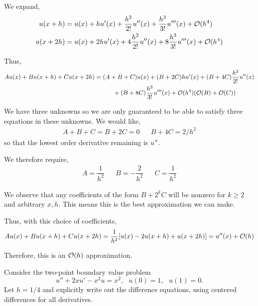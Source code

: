\documentclass[10pt]{article}
\begin{document}
\begin{solution}[Solution]
We expand,
\begin{align*}
    u(x+h) &= u(x) + h u'(x) + \dfrac{h^2}{2!}u''(x) + \dfrac{h^3}{3!}u'''(x) + \mathcal{O}(h^4) \\
    u(x+2h) &= u(x) + 2h u'(x) + 4\dfrac{h^2}{2!}u''(x) + 8\dfrac{h^3}{3!}u'''(x) + \mathcal{O}(h^4) 
\end{align*}

Thus,
\begin{align*}
    Au(x) + Bu(x+h) + Cu(x+2h) 
    &= (A+B+C) u(x) + (B+2C)hu'(x) + (B+4C) \dfrac{h^2}{2!}u''(x)  \\
    & \hspace{3em}+ (B+8C)\dfrac{h^3}{3!}u'''(x) + \mathcal{O}(h^4)(\mathcal{O}(B)+\mathcal{O}(C))
\end{align*}

We have three unknowns so we are only guaranteed to be able to satisfy three equations in these unknowns. We would like,
\begin{align*}
    A+B+C = B+2C= 0 && B+4C = 2/h^2
\end{align*}
so that the lowest order derivative remaining is \( u'' \).

We therefore require,
\begin{align*}
    A = \dfrac{1}{h^2} && B = -\dfrac{2}{h^2} && C = \dfrac{1}{h^2}
\end{align*}

We observe that any coefficients of the form \( B+2^k C \) will be nonzero for \( k\geq 2 \) and arbitrary \( x,h \). This means this is the best approximation we can make.

Thus, with this choice of coefficients,
\begin{align*}
    Au(x) + Bu(x+h) + Cu(x+2h) = \dfrac{1}{h^2}[u(x) - 2u(x+h) + u(x+2h)] = u''(x) + \mathcal{O}(h)
\end{align*}

Therefore, this is an \( \mathcal{O}(h) \) approximation.
\end{solution}

\begin{problem}[Problem 5]
Consider the two-point boundary value problem
\[ u'' + 2xu' - x^2 u = x^2 ,~~~u(0)=1,~~~u(1) = 0 .\]
Let \(h=1/4\) and explicitly write out the difference equations, using centered differences for all derivatives.
\end{problem}
\end{document}
